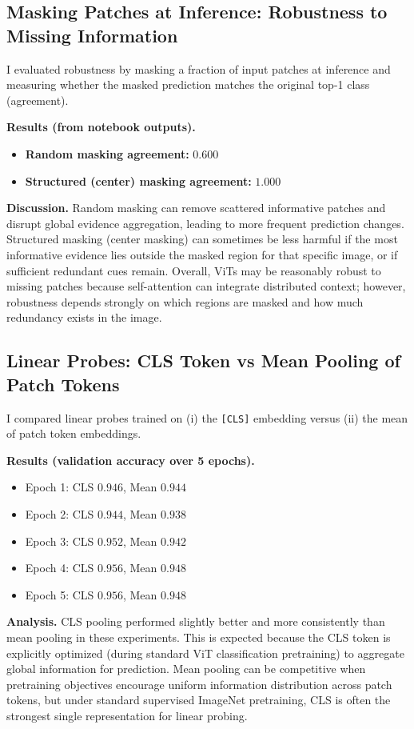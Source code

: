 \documentclass{article}
\begin{document}
\subsection{Masking Patches at Inference: Robustness to Missing Information}
I evaluated robustness by masking a fraction of input patches at inference and measuring whether the masked prediction matches the original top-1 class (agreement).

\textbf{Results (from notebook outputs).}
\begin{itemize}
    \item \textbf{Random masking agreement:} $0.600$
    \item \textbf{Structured (center) masking agreement:} $1.000$
\end{itemize}

\textbf{Discussion.} Random masking can remove scattered informative patches and disrupt global evidence aggregation, leading to more frequent prediction changes. Structured masking (center masking) can sometimes be less harmful if the most informative evidence lies outside the masked region for that specific image, or if sufficient redundant cues remain. Overall, ViTs may be reasonably robust to missing patches because self-attention can integrate distributed context; however, robustness depends strongly on which regions are masked and how much redundancy exists in the image.

\subsection{Linear Probes: CLS Token vs Mean Pooling of Patch Tokens}
I compared linear probes trained on (i) the \texttt{[CLS]} embedding versus (ii) the mean of patch token embeddings.

\textbf{Results (validation accuracy over 5 epochs).}
\begin{itemize}
    \item Epoch 1: CLS $0.946$, Mean $0.944$
    \item Epoch 2: CLS $0.944$, Mean $0.938$
    \item Epoch 3: CLS $0.952$, Mean $0.942$
    \item Epoch 4: CLS $0.956$, Mean $0.948$
    \item Epoch 5: CLS $0.956$, Mean $0.948$
\end{itemize}

\textbf{Analysis.} CLS pooling performed slightly better and more consistently than mean pooling in these experiments. This is expected because the CLS token is explicitly optimized (during standard ViT classification pretraining) to aggregate global information for prediction. Mean pooling can be competitive when pretraining objectives encourage uniform information distribution across patch tokens, but under standard supervised ImageNet pretraining, CLS is often the strongest single representation for linear probing.
\end{document}

